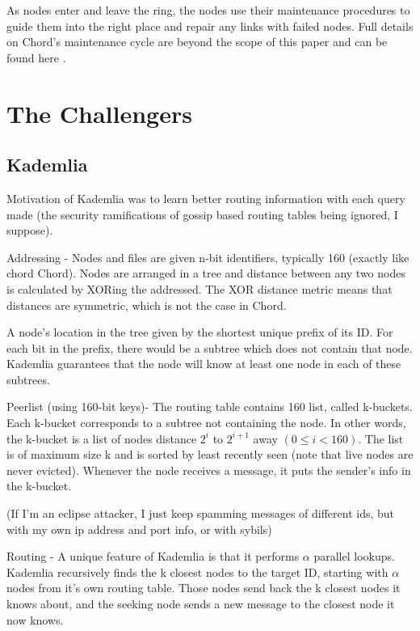 \documentclass[10pt,letterpaper]{report}
\begin{document}
As nodes enter and leave the ring, the nodes use their maintenance procedures to guide them into the right place and repair any links with failed nodes.  Full details on Chord's maintenance cycle are beyond the scope of this paper and can be found here \cite{chord}.



\chapter{The Challengers}

\section{Kademlia}

\cite{kademlia}
Motivation of Kademlia was to learn better routing information with each query made (the security ramifications of gossip based routing tables being ignored, I suppose).

Addressing  -  Nodes and files are given n-bit identifiers, typically 160 (exactly like chord Chord).  Nodes are arranged in a tree and distance between any two nodes is calculated by XORing the addressed.  The XOR distance metric means that distances are symmetric, which is not the case in Chord.

A node's location in the tree given by the shortest unique prefix of its ID.   For each bit in the prefix, there would be a subtree which does not contain that node.  Kademlia guarantees that the node will know at least one node in each of these subtrees.


Peerlist  (using 160-bit keys)-  The routing table contains 160 list, called k-buckets.  Each k-bucket corresponds to a subtree not containing the node. In other words, the k-bucket is a list of nodes distance $2^i$ to $2^{i+1}$ away $(0 \leq i < 160)$.  The list is of maximum size k and is sorted by least recently seen  (note that live nodes are never evicted).  Whenever the node receives a message, it puts the sender's info in the k-bucket.  

(If I'm an eclipse attacker, I just keep spamming messages of different ids, but with my own ip address and port info, or with sybils)



Routing  -  A unique feature of Kademlia is that it performs $\alpha$ parallel lookups.    Kademlia recursively finds the k closest nodes to the target ID, starting with $\alpha$ nodes from it's own routing table.  Those nodes send back the k closest nodes it knows about, and the seeking node sends a new message to the closest node it now knows.
\end{document}
